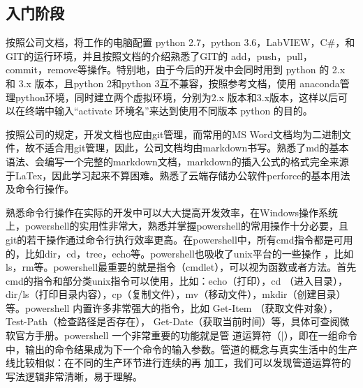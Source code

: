 \documentclass[UTF8]{ctexart}
\begin{document}
\subsection{入门阶段}
按照公司文档，将工作的电脑配置 python 2.7，python 3.6，LabVIEW，C\#，和GIT的运行环境，并且按照文档的介绍熟悉了GIT的 add，push，pull，
commit，remove等操作。特别地，由于今后的开发中会同时用到 python 的 2.x 和 3.x 版本，且python 2和python 3互不兼容，按照参考文档，使用 
anaconda管理python环境，同时建立两个虚拟环境，分别为2.x 版本和3.x版本，这样以后可以在终端中输入“activate 环境名”来达到使用不同版本 python
的目的。
\par
按照公司的规定，开发文档也应由git管理，而常用的MS Word文档均为二进制文件，故不适合用git管理，因此，公司文档均由markdown书写。熟悉了md的基本
语法、会编写一个完整的markdown文档，markdown的插入公式的格式完全来源于LaTex，因此学习起来不算困难。熟悉了云端存储办公软件perforce的基本用法
及命令行操作。
\par
熟悉命令行操作在实际的开发中可以大大提高开发效率，在Windows操作系统上，powershell的实用性非常大，熟悉并掌握powershell的常用操作十分必要，且
git的若干操作通过命令行执行效率更高。在powershell中，所有cmd指令都是可用的，比如dir，cd，tree，echo等。powershell也吸收了unix平台的一些操作
，比如ls，rm等。powershell最重要的就是指令（cmdlet），可以视为函数或者方法。首先cmd的指令和部分类unix指令可以使用，比如：echo（打印），cd
（进入目录），dir/ls（打印目录内容），cp（复制文件），mv（移动文件），mkdir（创建目录）等。powershell 内置许多非常强大的指令，比如 Get-Item
（获取文件对象）， Test-Path（检查路径是否存在）， Get-Date（获取当前时间）等，具体可查阅微软官方手册。powershell 一个非常重要的功能就是管
道运算符（|），即在一组命令中，输出的命令结果成为下一个命令的输入参数。管道的概念与真实生活中的生产线比较相似：在不同的生产环节进行连续的再
加工，我们可以发现管道运算符的写法逻辑非常清晰，易于理解。

%
\end{document}
